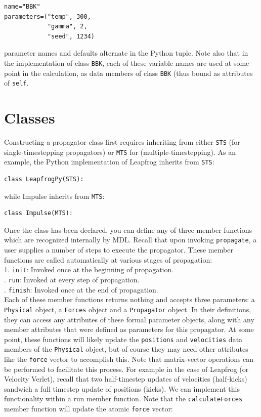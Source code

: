 \documentclass[11pt]{report}
\begin{document}
\begin{verbatim}
name="BBK"  
parameters=("temp", 300,
            "gamma", 2,
            "seed", 1234) 
\end{verbatim}

parameter names and defaults alternate in the Python tuple.  Note also that in
the implementation of class \texttt{BBK}, each of these variable names are used
at some point in the calculation, as data members of class \texttt{BBK} (thus
bound as attributes of \texttt{self}.


\section{Classes}

Constructing a propagator class first requires inheriting from either \texttt{STS}
(for single-timestepping propagators) or \texttt{MTS} for (multiple-timestepping).
As an example, the Python implementation of Leapfrog inherits from \texttt{STS}:

\begin{verbatim}
class LeapfrogPy(STS):
\end{verbatim}

while Impulse inherits from \texttt{MTS}:

\begin{verbatim}
class Impulse(MTS):
\end{verbatim}

Once the class has been declared, you can define any of three member functions 
which are recognized internally by MDL.  Recall that upon invoking
\texttt{propagate}, a user supplies a number of steps to execute the propagator.
These member functions are called automatically at various stages of propagation:   \\

1. \texttt{init}: Invoked once at the beginning of propagation. \\
. \texttt{run}: Invoked at every step of propagation. \\
. \texttt{finish}: Invoked once at the end of propagation. \\

Each of these member functions returns nothing and accepts three parameters:
a \texttt{Physical} object, a \texttt{Forces} object and a \texttt{Propagator} object.
In their definitions, they can access any attributes of these formal parameter objects,
along with any member attributes that were defined as parameters for this propagator.
At some point, these functions will likely update the \texttt{positions} and 
\texttt{velocities} data members of the \texttt{Physical} object, but of course
they may need other attributes like the \texttt{force} vector to accomplish this.
Note that matrix-vector operations can be performed to facilitate this process.
For example in the case of Leapfrog (or Velocity Verlet), recall that two
half-timestep updates of velocities (half-kicks) sandwich a full timestep
update of positions (kicks).  We can implement this functionality within 
a run member function.  Note that the \texttt{calculateForces} member
function will update the atomic \texttt{force} vector:
\end{document}
